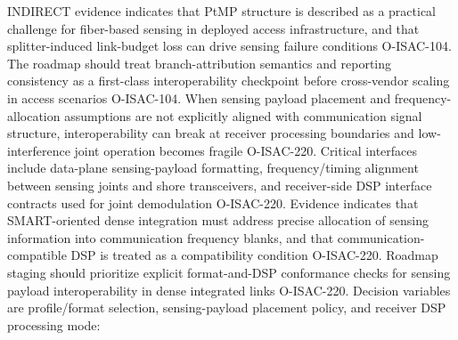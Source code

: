 {} INDIRECT evidence indicates that PtMP structure is described as a practical challenge for fiber-based sensing in deployed access infrastructure, and that splitter-induced link-budget loss can drive sensing failure conditions O-ISAC-104.\markdownRendererParagraphSeparator
{} The roadmap should treat branch-attribution semantics and reporting consistency as a first-class interoperability checkpoint before cross-vendor scaling in access scenarios O-ISAC-104.\markdownRendererInterblockSeparator
{}
\markdownRendererSectionEnd \markdownRendererSectionBegin
{}\markdownRendererInterblockSeparator
{} When sensing payload placement and frequency-allocation assumptions are not explicitly aligned with communication signal structure, interoperability can break at receiver processing boundaries and low-interference joint operation becomes fragile O-ISAC-220.\markdownRendererParagraphSeparator
{} Critical interfaces include data-plane sensing-payload formatting, frequency/timing alignment between sensing joints and shore transceivers, and receiver-side DSP interface contracts used for joint demodulation O-ISAC-220.\markdownRendererParagraphSeparator
{} Evidence indicates that SMART-oriented dense integration must address precise allocation of sensing information into communication frequency blanks, and that communication-compatible DSP is treated as a compatibility condition O-ISAC-220.\markdownRendererParagraphSeparator
{} Roadmap staging should prioritize explicit format-and-DSP conformance checks for sensing payload interoperability in dense integrated links O-ISAC-220.\markdownRendererInterblockSeparator
{}
\markdownRendererSectionEnd \markdownRendererSectionBegin
{}\markdownRendererInterblockSeparator
{}Decision variables are profile/format selection, sensing-payload placement policy, and receiver DSP processing mode:\markdownRendererParagraphSeparator
{}\markdownRendererParagraphSeparator
